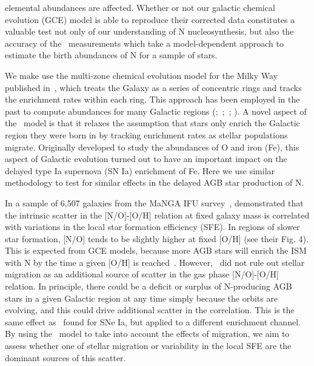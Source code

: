 \documentclass[ms.tex]{subfiles}
\begin{document}
elemental abundances are affected.
Whether or not our galactic chemical evolution (GCE) model is able to reproduce
their corrected data constitutes a valuable test not only of our understanding
of N nucleosynthesis, but also the accuracy of the~\citet{Vincenzo2021}
measurements which take a model-dependent approach to estimate the birth
abundances of N for a sample of stars.
\par
We make use the multi-zone chemical evolution model for the Milky Way
published in~\citet{Johnson2021}, which treats the Galaxy as a series of
concentric rings and tracks the enrichment rates within each ring.
This approach has been employed in the past to compute abundances for many
Galactic regions (\citealp{Matteucci1989, Wyse1989, Prantzos1995,
Schoenrich2009};~\citealp*{Minchev2013, Minchev2014};~\citealp{Minchev2017};
\citealp*{Sharma2020}).
A novel aspect of the~\citet{Johnson2021} model is that it relaxes the
assumption that stars only enrich the Galactic region they were born in by
tracking enrichment rates as stellar populations migrate.
Originally developed to study the abundances of O and iron (Fe), this aspect of
Galactic evolution turned out to have an important impact on the delayed type
Ia supernova (SN Ia) enrichment of Fe.
Here we use similar methodology to test for similar effects in the delayed AGB
star production of N.
\par
In a sample of 6,507 galaxies from the MaNGA IFU survey~\citep{Bundy2015},
\citet{Schaefer2020} demonstrated that the intrinsic scatter in the [N/O]-[O/H]
relation at fixed galaxy mass is correlated with variations in the local star
formation efficiency (SFE).
In regions of slower star formation, [N/O] tends to be slightly higher at fixed
[O/H] (see their Fig. 4).
This is expected from GCE models, because more AGB stars will enrich the ISM
with N by the time a given [O/H] is reached~\citep[e.g.][]{Molla2006,
Vincenzo2016a}.
However,~\citet{Schaefer2020} did not rule out stellar migration as an
additional source of scatter in the gas phase [N/O]-[O/H] relation.
In principle, there could be a deficit or surplus of N-producing AGB stars in a
given Galactic region at any time simply because the orbits are evolving, and
this could drive additional scatter in the correlation.
This is the same effect as~\citet{Johnson2021} found for SNe Ia, but applied to
a different enrichment channel.
By using the~\citet{Johnson2021} model to take into account the effects of
migration, we aim to assess whether one of stellar migration or variability in
the local SFE are the dominant sources of this scatter.
\end{document}
